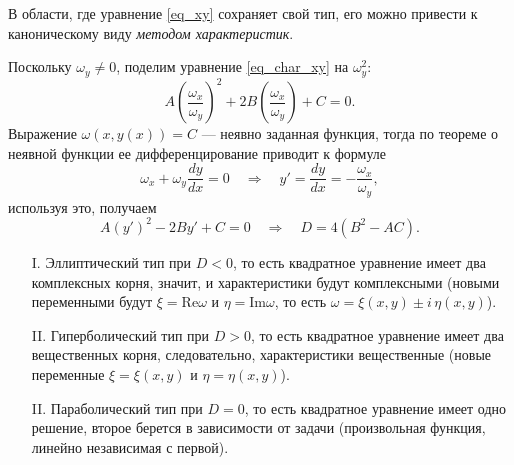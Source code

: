 \documentclass[12pt,a5paper]{book}
\begin{document}
	В области, где уравнение \eqref{eq_xy} сохраняет свой тип, его можно привести к каноническому виду \emph{методом характеристик}.
	
	Поскольку $\omega_y \neq 0$, поделим уравнение \eqref{eq_char_xy} на $\omega^2_y$:
	\begin{equation*}
		A\left(\frac{\omega_x}{\omega_y}\right)^2 + 2B\left(\frac{\omega_x}{\omega_y}\right) + C = 0.
	\end{equation*}
	Выражение $\omega(x, y(x)) = C$ --- неявно заданная функция, тогда по теореме о неявной функции ее дифференцирование приводит к формуле
	\begin{equation*}
		\omega_x + \omega_y \frac{dy}{dx} = 0 \quad \Rightarrow \quad y' = \frac{dy}{dx} = -\frac{\omega_x}{\omega_y},
	\end{equation*}
	используя это, получаем
	\begin{equation*}
		A\left(y'\right)^2 - 2By' + C = 0 \quad \Rightarrow \quad D = 4(B^2 - AC).
	\end{equation*}
	
	\begin{itemize}
		\item [I.] Эллиптический тип при $D < 0$, то есть квадратное уравнение имеет два комплексных корня, значит, и характеристики будут комплексными (новыми переменными будут $\xi = \text{Re}\omega$ и $\eta = \text{Im}\omega$, то есть $\omega = \xi(x,y) \pm i\,\eta(x,y)$).
		\item [II.] Гиперболический тип при $D > 0$, то есть квадратное уравнение имеет два вещественных корня, следовательно, характеристики вещественные (новые переменные $\xi = \xi(x,y)$ и $\eta = \eta(x,y)$).
		\item [II.] Параболический тип при $D = 0$, то есть квадратное уравнение имеет одно решение, второе берется в зависимости от задачи (произвольная функция, линейно независимая с первой).
	\end{itemize}
\end{document}
